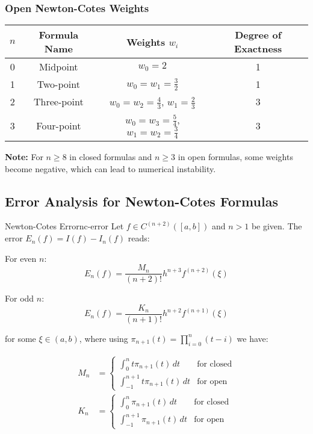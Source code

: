 \subsubsection{Open Newton-Cotes Weights}

\begin{center}
\begin{tabular}{|c|c|c|c|}
\hline
$n$ & Formula Name & Weights $w_i$ & Degree of Exactness \\
\hline
0 & Midpoint & $w_0 = 2$ & 1 \\
\hline
1 & Two-point & $w_0 = w_1 = \frac{3}{2}$ & 1 \\
\hline
2 & Three-point & $w_0 = w_2 = \frac{4}{3}$, $w_1 = \frac{2}{3}$ & 3 \\
\hline
3 & Four-point & $w_0 = w_3 = \frac{5}{4}$, $w_1 = w_2 = \frac{3}{4}$ & 3 \\
\hline
\end{tabular}
\end{center}

\textbf{Note:} For $n \geq 8$ in closed formulas and $n \geq 3$ in open formulas, some weights become negative, which can lead to numerical instability.

\subsection{Error Analysis for Newton-Cotes Formulas}

\begin{theorem}{Newton-Cotes Error}{nc-error}
Let $f \in C^{(n+2)}([a,b])$ and $n > 1$ be given. The error $E_n(f) = I(f) - I_n(f)$ reads:

For even $n$:
\[E_n(f) = \frac{M_n}{(n+2)!} h^{n+3} f^{(n+2)}(\xi)\]

For odd $n$:
\[E_n(f) = \frac{K_n}{(n+1)!} h^{n+2} f^{(n+1)}(\xi)\]

for some $\xi \in (a,b)$, where using $\pi_{n+1}(t) = \prod_{i=0}^n (t-i)$ we have:

\begin{align}
M_n &= \begin{cases}
\int_0^n t\pi_{n+1}(t) \, dt & \text{for closed} \\
\int_{-1}^{n+1} t\pi_{n+1}(t) \, dt & \text{for open}
\end{cases} \\
K_n &= \begin{cases}
\int_0^n \pi_{n+1}(t) \, dt & \text{for closed} \\
\int_{-1}^{n+1} \pi_{n+1}(t) \, dt & \text{for open}
\end{cases}
\end{align}
\end{theorem}

